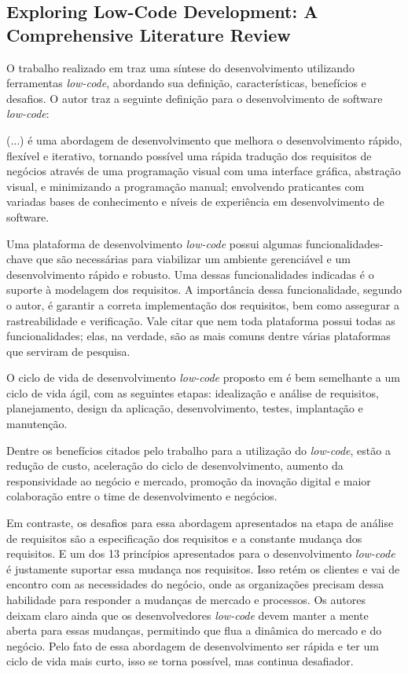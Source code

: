 	\subsection{Exploring Low-Code Development: A Comprehensive Literature Review}

	O trabalho realizado em \cite{LowCodeExploring} traz uma síntese do desenvolvimento utilizando
	ferramentas \textit{low-code}, abordando sua definição, características, benefícios e desafios.
	O autor traz a seguinte definição para o desenvolvimento de software \textit{low-code}:

	\begin{quoting}
	\noindent (...) é uma abordagem de desenvolvimento que melhora o desenvolvimento rápido, flexível e iterativo, tornando possível
	uma rápida tradução dos requisitos de negócios através de uma programação visual com uma interface gráfica, abstração visual,
	e minimizando a programação manual; envolvendo praticantes com variadas bases de conhecimento e níveis de experiência em
	desenvolvimento de software.
	\end{quoting}

	Uma plataforma de desenvolvimento \textit{low-code} possui algumas funcionalidades-chave que são necessárias para viabilizar um
	ambiente gerenciável e um desenvolvimento rápido e robusto. Uma dessas funcionalidades indicadas é o suporte à modelagem dos requisitos. A importância dessa funcionalidade, segundo
	o autor, é garantir a correta implementação dos requisitos, bem como assegurar a rastreabilidade e verificação. Vale citar que nem toda plataforma possui todas as funcionalidades; elas, na
	verdade, são as mais comuns dentre várias plataformas que serviram de pesquisa.

	O ciclo de vida de desenvolvimento \textit{low-code} proposto em \cite{LowCodeExploring} é bem semelhante a um ciclo de vida ágil, com as seguintes etapas: idealização e análise
	de requisitos, planejamento, design da aplicação, desenvolvimento, testes, implantação e manutenção.

	Dentre os benefícios citados pelo trabalho para a utilização do \textit{low-code}, estão a redução de custo, aceleração do ciclo de desenvolvimento, aumento da responsividade
	ao negócio e mercado, promoção da inovação digital e maior colaboração entre o time de desenvolvimento e negócios.

	Em contraste, os desafios para essa abordagem apresentados na etapa de análise de requisitos são a especificação dos requisitos e a constante mudança dos requisitos. E um dos 13 princípios
	apresentados para o desenvolvimento \textit{low-code} é justamente suportar essa mudança nos requisitos. Isso retém os clientes e vai de encontro com as necessidades do negócio,
	onde as organizações precisam dessa habilidade para responder a mudanças de mercado e processos. Os autores deixam claro ainda que os desenvolvedores \textit{low-code} devem manter a mente aberta
	para essas mudanças, permitindo que flua a dinâmica do mercado e do negócio. Pelo fato de essa abordagem de desenvolvimento ser rápida e ter um ciclo de vida mais curto, isso se torna possível,
	mas continua desafiador.
